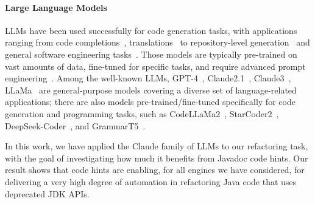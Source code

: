 \documentclass[sigconf,review,anonymous]{acmart}
\begin{document}
\paragraph{Large Language Models}
%
LLMs have been used successfully for code generation tasks,
with applications ranging from code
completions~\cite{llmsforcodecompletion,ni2023lever,codegenclasslevel,Ding2024cocomic},
translations~\cite{tang-etal-2023-explain,lostintranslation} to
repository-level generation~\cite{zhang2023repocoder} and general software
engineering tasks~\cite{yang2024sweagent}.  Those models are typically
pre-trained on vast amounts of data, fine-tuned for specific tasks, and
require advanced prompt engineering~\cite{jiang2024survey}. 
Among the well-known LLMs, GPT-4~\cite{openai2024gpt4}, Claude2.1~\cite{claude},
Claude3~\cite{claude}, LLaMa~\cite{touvron2023llama} are general-purpose
models covering a diverse set of language-related applications; there are
also models pre-trained/fine-tuned specifically for code generation and
programming tasks, such as CodeLLaMa2~\cite{roziere2024code},
StarCoder2~\cite{lozhkov2024starcoder},
DeepSeek-Coder~\cite{guo2024deepseekcoder}, and GrammarT5~\cite{grammart5}.


In this work, we have applied the Claude family of LLMs to our refactoring
task, with the goal of investigating how much it benefits from Javadoc code
hints.  Our result shows that code hints are enabling, for all engines we
have considered, for delivering a very high degree of automation in
refactoring Java code that uses deprecated JDK APIs.


\end{document}

